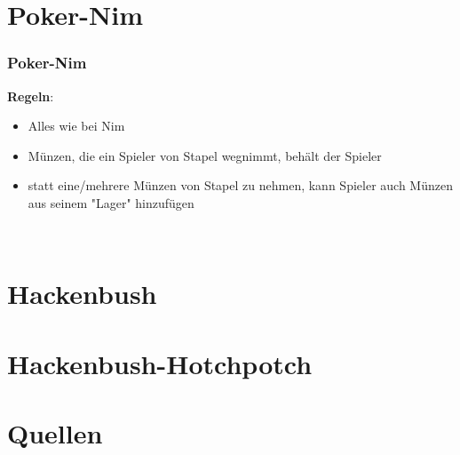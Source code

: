 \documentclass[12pt, aspectratio=169]{beamer}
\begin{document}
\section{Poker-Nim}
\begin{frame}
    \frametitle{Poker-Nim}
    \textbf{Regeln}:
    \begin{itemize}
        \item Alles wie bei Nim
        \item Münzen, die ein Spieler von Stapel wegnimmt, behält der Spieler
        \item statt eine/mehrere Münzen von Stapel zu nehmen, kann Spieler auch Münzen aus seinem "Lager" hinzufügen 
    \end{itemize}
    \begin{center}
        \\
    \end{center}
\end{frame}

\section{Hackenbush}
\section{Hackenbush-Hotchpotch}

\section{Quellen}
\begin{frame}
    \nocite{*}
	\hfill
    
    
\end{frame}
\end{document}
